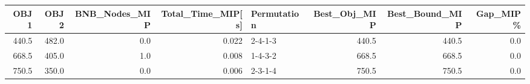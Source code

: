 \begin{tabular}{rrrrlrrr}
\toprule
  OBJ1 &   OBJ2 &  BNB\_Nodes\_MIP &  Total\_Time\_MIP[s] & Permutation &  Best\_Obj\_MIP &  Best\_Bound\_MIP &  Gap\_MIP\% \\
\midrule
 440.5 &  482.0 &            0.0 &              0.022 &     2-4-1-3 &         440.5 &           440.5 &       0.0 \\
 668.5 &  405.0 &            1.0 &              0.008 &     1-4-3-2 &         668.5 &           668.5 &       0.0 \\
 750.5 &  350.0 &            0.0 &              0.006 &     2-3-1-4 &         750.5 &           750.5 &       0.0 \\
\bottomrule
\end{tabular}
